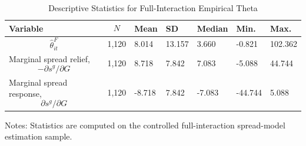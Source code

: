 \begin{table}[H]\centering
\begin{threeparttable}
\caption{Descriptive Statistics for Full-Interaction Empirical Theta}
\label{tab:theta_descriptive_stats}
\scriptsize
\begin{tabularx}{\textwidth}{lYYYYYY}
\toprule
Variable & $$N$$ & Mean & SD & Median & Min. & Max. \\
\midrule
$$\widehat{\theta}^{F}_{it}$$ & 1,120 & 8.014 & 13.157 & 3.660 & -0.821 & 102.362 \\
Marginal spread relief, $$-\partial s^g/\partial G$$ & 1,120 & 8.718 & 7.842 & 7.083 & -5.088 & 44.744 \\
Marginal spread response, $$\partial s^g/\partial G$$ & 1,120 & -8.718 & 7.842 & -7.083 & -44.744 & 5.088 \\
\bottomrule
\end{tabularx}
\begin{tablenotes}[flushleft]\footnotesize
\item Notes: Statistics are computed on the controlled full-interaction spread-model estimation sample.
\end{tablenotes}
\end{threeparttable}
\end{table}
